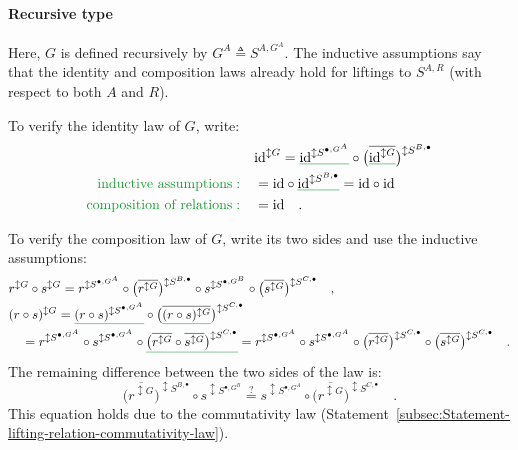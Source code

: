 \paragraph{Recursive type}

Here, $G$ is defined recursively by $G^{A}\triangleq S^{A,G^{A}}$.
The inductive assumptions say that the identity and composition laws
already hold for liftings to $S^{A,R}$ (with respect to both $A$
and $R$).

To verify the identity law of $G$, write:
\begin{align*}
 & \text{id}^{\updownarrow G}=\gunderline{\text{id}^{\updownarrow S^{\bullet,G^{A}}}}\circ\big(\overline{\gunderline{\text{id}^{\updownarrow G}}}\big)^{\updownarrow S^{B,\bullet}}\\
{\color{greenunder}\text{inductive assumptions}:}\quad & =\text{id}\circ\gunderline{\text{id}^{\updownarrow S^{B,\bullet}}}=\text{id}\circ\text{id}\\
{\color{greenunder}\text{composition of relations}:}\quad & =\text{id}\quad.
\end{align*}

To verify the composition law of $G$, write its two sides and use
the inductive assumptions:
\begin{align*}
 & r^{\updownarrow G}\circ s^{\updownarrow G}=r^{\updownarrow S^{\bullet,G^{A}}}\circ\big(\overline{r^{\updownarrow G}}\big)^{\updownarrow S^{B,\bullet}}\circ s^{\updownarrow S^{\bullet,G^{B}}}\circ\big(\overline{s^{\updownarrow G}}\big)^{\updownarrow S^{C,\bullet}}\quad,\\
 & (r\circ s)^{\updownarrow G}=\gunderline{(r\circ s)^{\updownarrow S^{\bullet,G^{A}}}}\circ\big(\overline{\gunderline{(r\circ s)^{\updownarrow G}}}\big)^{\updownarrow S^{C,\bullet}}\\
 & \quad=r^{\updownarrow S^{\bullet,G^{A}}}\circ s^{\updownarrow S^{\bullet,G^{A}}}\circ\gunderline{\big(\overline{r^{\updownarrow G}}\circ\overline{s^{\updownarrow G}}\big)^{\updownarrow S^{C,\bullet}}}=r^{\updownarrow S^{\bullet,G^{A}}}\circ s^{\updownarrow S^{\bullet,G^{A}}}\circ\big(\overline{r^{\updownarrow G}}\big)^{\updownarrow S^{C,\bullet}}\circ\big(\overline{s^{\updownarrow G}}\big)^{\updownarrow S^{C,\bullet}}\quad.
\end{align*}
The remaining difference between the two sides of the law is:
\[
\big(\overline{r^{\updownarrow G}}\big)^{\updownarrow S^{B,\bullet}}\circ s^{\updownarrow S^{\bullet,G^{B}}}\overset{?}{=}s^{\updownarrow S^{\bullet,G^{A}}}\circ\big(\overline{r^{\updownarrow G}}\big)^{\updownarrow S^{C,\bullet}}\quad.
\]
This equation holds due to the commutativity law (Statement~\ref{subsec:Statement-lifting-relation-commutativity-law}).

